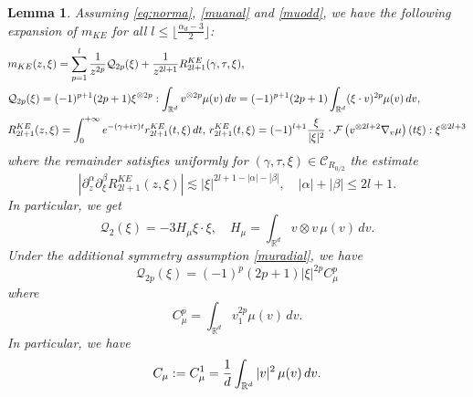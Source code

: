 \documentclass[11pt]{amsart}
\numberwithin{equation}{section}
\newtheorem{lem}{Lemma}[section]
\begin{document}
  \begin{lem}
  \label{remarkmKE}
  Assuming \eqref{eq:norma}, \eqref{muanal} and \eqref{muodd}, we have the following  expansion of $m_{KE}$ for all $l \leq \lfloor \frac{\alpha_d-3}{2} \rfloor$:  
  \begin{align}
  \label{mKErefined}
  & m_{KE}(z, \xi)=  \sum_{p= 1}^l
     { 1 \over z^{2p}}  \mathcal{Q}_{2p}(\xi)   +   { 1 \over z^{2l+1}} R^{KE}_{2l+1}(\gamma, \tau, \xi), \\
 & \label{Q2p}  \mathcal{Q}_{2p}(\xi) =  (-1)^{p+1} (2p+1) \xi^{\otimes 2p}  : \int_{\mathbb{R}^d} v^{\otimes 2p} \mu(v)\, dv
 = (-1)^{p+1} (2p+1)   \int_{\mathbb{R}^d}  (\xi \cdot v)^{2p} \mu(v)\, dv ,
  \\
&    \label{resteKE}  R_{2l+1}^{KE}(z, \xi) =  \int_{0}^{+ \infty} e^{-(\gamma + i \tau) t} r_{2l+1}^{KE}(t,\xi)\, dt, \,
  r_{2l+1}^{KE}(t,\xi)=
       (-1)^{l+1}    {\xi \over | \xi|^2}\cdot \mathcal{F}\left(v^{\otimes 2l+2}\nabla_{v} \mu\right) (t\xi):\xi^{\otimes 2l+3}
  \end{align}
  where the remainder  satisfies uniformly  for $(\gamma, \tau, \xi) \in \mathcal{C}_{R_{0/2}}$ the estimate
 \begin{equation}
  \label{remindermKE}  |\partial_{z}^\alpha \partial_{\xi}^\beta R_{2l+1}^{KE}(z, \xi) |
   \lesssim  | \xi|^{2 l+ 1 - | \alpha | - | \beta |}, \quad | \alpha | + | \beta | \leq 2l +1.
  \end{equation}
  In particular, we get
  $$ \mathcal{Q}_{2}(\xi)=  - 3 H_{\mu} \xi \cdot \xi, \quad H_{\mu}= \int_{\mathbb{R}^d} v\otimes v\, \mu(v) \, dv. $$
  Under the additional symmetry assumption \eqref{muradial}, we have  
 \begin{equation}
 \label{Q2pbetter}   \mathcal{Q}_{2p}(\xi)= (-1)^p (2p+ 1 ) | \xi|^{2p} C^p_{\mu}
\end{equation}
 where
 $$  C^p_{\mu} = \int_{\mathbb{R}^d} v_{1}^{2p} \mu(v)\, dv.$$
 In particular, we have  
 $$ C_{\mu} := C^1_{\mu}= { 1 \over d} \int_{\mathbb{R}^d} |v|^2 \, \mu(v)\, dv.$$
   
  \end{lem}

 
\end{document}
